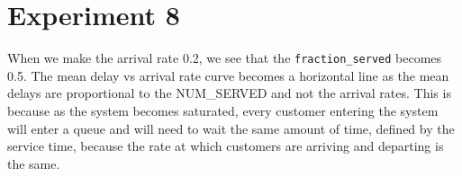 \section*{Experiment 8}
When we make the arrival rate 0.2, we see that the \texttt{fraction_served} becomes 0.5. The mean delay vs arrival rate curve becomes a horizontal line as the mean delays are proportional to the NUM_SERVED and not the arrival rates.
This is because as the system becomes saturated, every customer entering the system will enter a queue and will need to wait the same amount of time, defined by the service time, because the rate at which customers are arriving and departing is the same.
